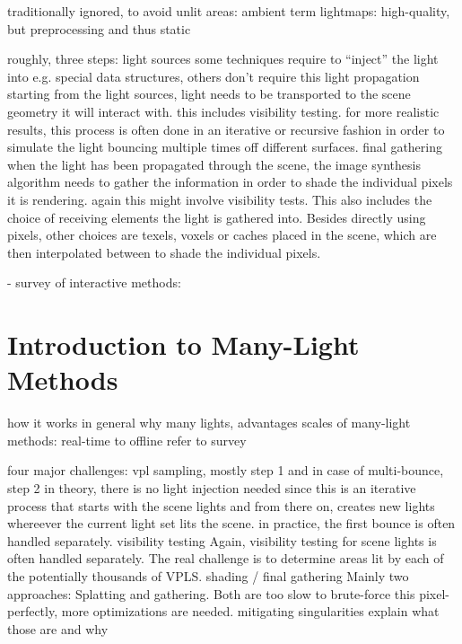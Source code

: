 
\begin{outline}


\1 traditionally ignored, to avoid unlit areas: ambient term
\1 lightmaps: high-quality, but preprocessing and thus static

\1 roughly, three steps:
    \2 light sources
        \3 some techniques require to ``inject'' the light into e.g. special data structures, others don't require this
    \2 light propagation
        \3 starting from the light sources, light needs to be transported to the scene geometry it will interact with. this includes visibility testing. for more realistic results, this process is often done in an iterative or recursive fashion in order to simulate the light bouncing multiple times off different surfaces.
    \2 final gathering
        \3 when the light has been propagated through the scene, the image synthesis algorithm needs to gather the information in order to shade the individual pixels it is rendering. again this might involve visibility tests. This also includes the choice of receiving elements the light is gathered into. Besides directly using pixels, other choices are texels, voxels or caches placed in the scene, which are then interpolated between to shade the individual pixels.

\end{outline}

- survey of interactive methods: \cite{Ritschel:2012:SAI:2283296.2283310}


\section{Introduction to Many-Light Methods}

\begin{outline}
\1 how it works in general
\1 why many lights, advantages
\1 scales of many-light methods: real-time to offline
\1 refer to survey \cite{Dachsbacher:2014:ManyLightsSTAR}

\1 four major challenges:
    \2 vpl sampling, mostly step 1 and in case of multi-bounce, step 2
        \3 in theory, there is no light injection needed since this is an iterative process that starts with the scene lights and from there on, creates new lights whereever the current light set lits the scene. in practice, the first bounce is often handled separately.
    \2 visibility testing
        \3 Again, visibility testing for scene lights is often handled separately. The real challenge is to determine areas lit by each of the potentially thousands of VPLS.
    \2 shading / final gathering
        \3 Mainly two approaches: Splatting and gathering. Both are too slow to brute-force this pixel-perfectly, more optimizations are needed.
    \2 mitigating singularities
        \3 explain what those are and why

\end{outline}

\cleardoublepage
